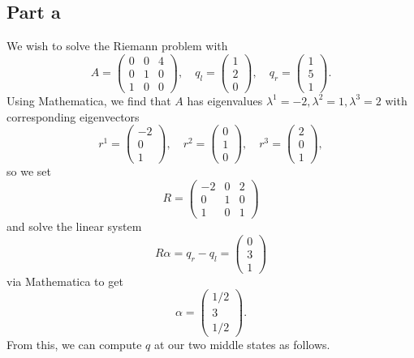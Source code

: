 \documentclass{article}
\begin{document}
\subsection{Part a}
We wish to solve the Riemann problem with 
\[
A=\begin{pmatrix}
	0&0&4\\0&1&0\\1&0&0
\end{pmatrix},\quad q_l=\begin{pmatrix}
	1\\2\\0
\end{pmatrix},\quad q_r=\begin{pmatrix}
	1\\5\\1
\end{pmatrix}.
\]
Using Mathematica, we find that $A$ has eigenvalues $\lambda^1=-2,\lambda^2=1,\lambda^3=2$ with corresponding eigenvectors
\[
r^1=\begin{pmatrix}
	-2\\0\\1
\end{pmatrix},\quad r^2=\begin{pmatrix}
	0\\1\\0
\end{pmatrix},\quad r^3=\begin{pmatrix}
	2\\0\\1
\end{pmatrix},
\]
so we set 
\[
R=\begin{pmatrix}
	-2&0&2\\	
	0&1&0\\
	1&0&1
\end{pmatrix}
\]
and solve the linear system 
\[
R\alpha=q_r-q_l=\begin{pmatrix}
	0\\3\\1
\end{pmatrix}
\]
via Mathematica to get
\[
\alpha=\begin{pmatrix}
	1/2\\3\\1/2
\end{pmatrix}.
\]
From this, we can compute $q$ at our two middle states as follows.
\end{document}
